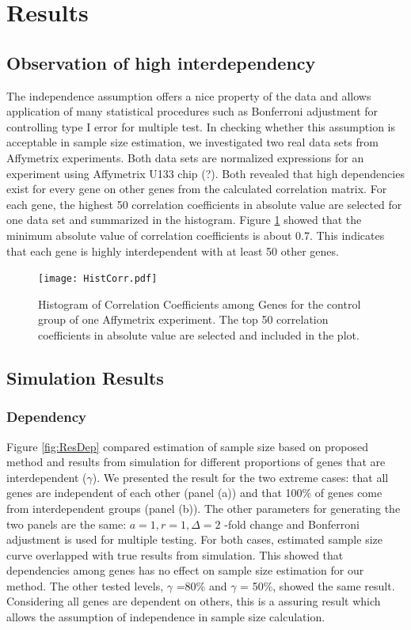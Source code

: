 \documentclass{bioinfo}
\begin{document}
\section{Results}

\subsection{Observation of high interdependency}
The independence assumption offers a nice property of the data and
allows application of many statistical procedures such as
Bonferroni adjustment for controlling type I error for multiple
test. In checking whether this assumption is acceptable in sample
size estimation, we investigated two real data sets from
Affymetrix experiments. Both data sets are normalized expressions
for an experiment using Affymetrix U133 chip (?). Both revealed
that high dependencies exist for every gene on other genes from
the calculated correlation matrix. For each gene, the highest 50
correlation coefficients in absolute value are selected for one
data set and summarized in the histogram. Figure
\ref{fig:HistCorr} showed that the minimum absolute value of
correlation coefficients is about 0.7. This indicates that each
gene is highly interdependent with at least 50 other genes.

\begin{figure}[h]
    \centerline{\texttt{[image: HistCorr.pdf]}}
    \caption[Histogram of Correlation Coefficients among Genes]
    {Histogram of Correlation Coefficients among Genes for the control group of one Affymetrix
    experiment. The top 50 correlation coefficients in absolute value are selected and included in the plot.}
    \label{fig:HistCorr}
\end{figure}

\subsection{Simulation Results}

\subsubsection{Dependency}

Figure \ref{fig:ResDep} compared estimation of sample size based
on proposed method and results from simulation for different
proportions of genes that are interdependent ($\gamma$). We
presented the result for the two extreme cases: that all genes are
independent of each other (panel (a)) and that 100\% of genes come
from interdependent groups (panel (b)). The other parameters for
generating the two panels are the same: $a = 1, r = 1, \Delta = 2$
-fold change and Bonferroni adjustment is used for multiple
testing. For both cases, estimated sample size curve overlapped
with true results from simulation. This showed that dependencies
among genes has no effect on sample size estimation for our
method. The other tested levels, $\gamma$ =80\% and $\gamma$ =
50\%, showed the same result. Considering all genes are dependent
on others, this is a assuring result which allows the assumption
of independence in sample size calculation.
\end{document}
